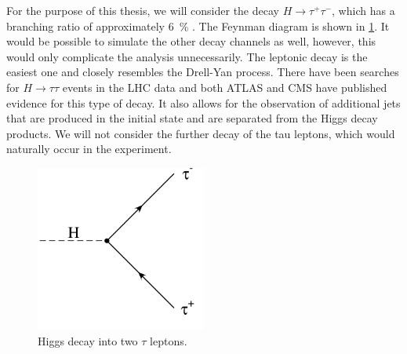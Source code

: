 For the purpose of this thesis, we will consider the decay $H \rightarrow \tau^+ \tau^-$, which has a branching ratio of approximately \SI{6}{\percent} \cite{higgshandbook3}.
The Feynman diagram is shown in \cref{fig:h_tautau}.
It would be possible to simulate the other decay channels as well, however, this would only complicate the analysis unnecessarily.
The leptonic decay is the easiest one and closely resembles the Drell-Yan process.
There have been searches for $H \rightarrow \tau \tau$ events in the LHC data and both ATLAS \cite{htau_atlas} and CMS \cite{htau_cms} have published evidence for this type of decay.
It also allows for the observation of additional jets that are produced in the initial state and are separated from the Higgs decay products.
We will not consider the further decay of the tau leptons, which would naturally occur in the experiment.
%
\begin{figure}[]
	\includegraphics[width=0.5\textwidth]{images/h_tautau.pdf}
	\caption{Higgs decay into two $\tau$ leptons.}
	\label{fig:h_tautau}
\end{figure}
%
